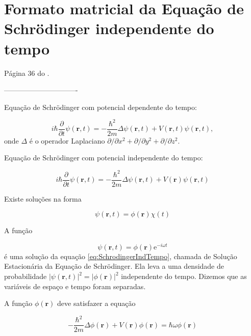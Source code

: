 \chapter{Formato matricial da Equação de Schrödinger independente do tempo}\label{apdc:eqSchr}

Página 36 do \cite{Cohen1}.

-------------------------------

Equação de Schrödinger com potencial dependente do tempo:
	
	\begin{equation}
		i\hbar\frac{\partial}{\partial t} \psi(\textbf{r},t) =  - \frac{\hbar^2}{2m}\Delta\psi(\textbf{r},t) + V(\textbf{r},t)\psi(\textbf{r},t),
	\end{equation}
	onde $\Delta$ é o operador Laplaciano $\partial / \partial x^2 + \partial / \partial y^2 + \partial / \partial z^2$.
	
	
	Equação de Schrödinger com potencial independente do tempo:
	
	\begin{equation}\label{eq:SchrodingerIndTempo}
		i\hbar\frac{\partial}{\partial t} \psi(\textbf{r},t) =  - \frac{\hbar^2}{2m}\Delta\psi(\textbf{r},t) + V(\textbf{r})\psi(\textbf{r},t)
	\end{equation}
	
	Existe soluções na forma
	
	\begin{equation}
		\psi(\textbf{r},t) = \phi(\textbf{r})\chi(t)
	\end{equation}
	
	A função 
	
	\begin{equation}\label{eq:solucaoSchro}
		\psi(\textbf{r},t) = \phi(\textbf{r})\mbox{e}^{-i \omega t}
	\end{equation}
	é uma solução da equação \ref{eq:SchrodingerIndTempo}, chamada de Solução Estacionária da Equação de Schrödinger. Ela leva a uma densidade de probabilidade $|\psi(\textbf{r},t)|^2 = |\phi(\textbf{r})|^2$ independente do tempo. Dizemos que as variáveis de espaço e tempo foram separadas.
	
	A função $\phi(\textbf{r})$ deve satisfazer a equação
	
	\begin{equation}\label{eq:SchroNoR}
		- \frac{\hbar^2}{2m} \Delta \phi(\textbf{r}) + V(\textbf{r}) \phi(\textbf{r}) = \hbar \omega \phi(\textbf{r})
	\end{equation}
	
